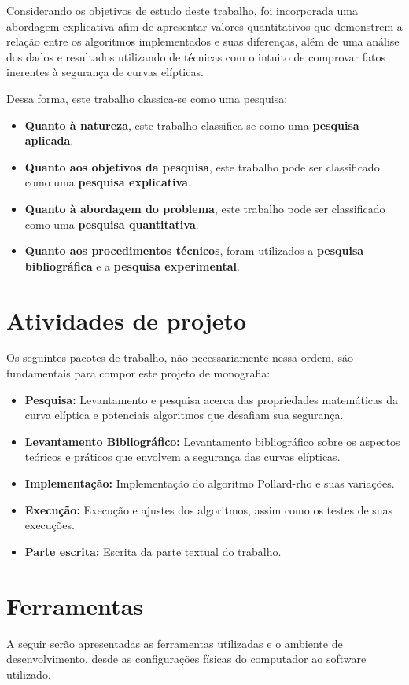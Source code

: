 Considerando os objetivos de estudo deste trabalho, foi incorporada uma abordagem explicativa afim de apresentar valores quantitativos que demonstrem a relação entre os algoritmos implementados e suas diferenças, além de uma análise dos dados e resultados utilizando de técnicas com o intuito de comprovar fatos inerentes à segurança de curvas elípticas.

Dessa forma, este trabalho classica-se como uma pesquisa:
\begin{itemize}
\item \textbf{Quanto à natureza}, este trabalho classifica-se como uma \textbf{pesquisa aplicada}.
\item \textbf{Quanto aos objetivos da pesquisa}, este trabalho pode ser classificado como uma \textbf{pesquisa explicativa}.
\item \textbf{Quanto à abordagem do problema}, este trabalho pode ser classificado como uma \textbf{pesquisa quantitativa}.
\item \textbf{Quanto aos procedimentos técnicos}, foram utilizados a \textbf{pesquisa bibliográfica} e a \textbf{pesquisa experimental}.
\end{itemize}
%
%
\section{Atividades de projeto}
Os seguintes pacotes de trabalho, não necessariamente nessa ordem, são fundamentais para compor este projeto de monografia:
\begin{itemize}
\item \textbf{Pesquisa:} Levantamento e pesquisa acerca das propriedades matemáticas da curva elíptica e potenciais algoritmos que desafiam sua segurança.
\item \textbf{Levantamento Bibliográfico:} Levantamento bibliográfico sobre os aspectos teóricos e práticos que envolvem a segurança das curvas elípticas.
\item \textbf{Implementação:} Implementação do algoritmo Pollard-rho e suas variações.
\item \textbf{Execução:} Execução e ajustes dos algoritmos, assim como os testes de suas execuções.
\item \textbf{Parte escrita:} Escrita da parte textual do trabalho.
\end{itemize}

\section{Ferramentas}
A seguir serão apresentadas as ferramentas utilizadas e o ambiente de desenvolvimento, desde as configurações físicas do computador ao software utilizado.

